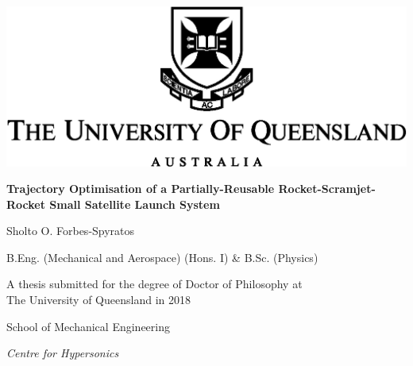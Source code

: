 \thispagestyle{empty}
\begin{center}
  \includegraphics{figures/uq_logo}

  \vspace{50pt}

  \textbf{\Large Trajectory Optimisation of a Partially-Reusable Rocket-Scramjet-Rocket Small Satellite Launch System}

  \vspace{25pt}

  {\large Sholto O. Forbes-Spyratos}

  \vspace{5pt}

  {\large B.Eng. (Mechanical and Aerospace) (Hons. I) \& B.Sc. (Physics)} \newline


  \vspace{60pt}
                                                                                                                                                                                                                                                                                                                                                                                                                                                                                                                                                                                                                                                                                                                                                                                                                                                                                                                                                                                                                                                 
  \vfill

  {\large A thesis submitted for the degree of Doctor of Philosophy at\\ The University of Queensland in 2018}

  \vspace{20pt}

  School of Mechanical Engineering
  
  \textit{Centre for Hypersonics}

  \vfill
\end{center}

